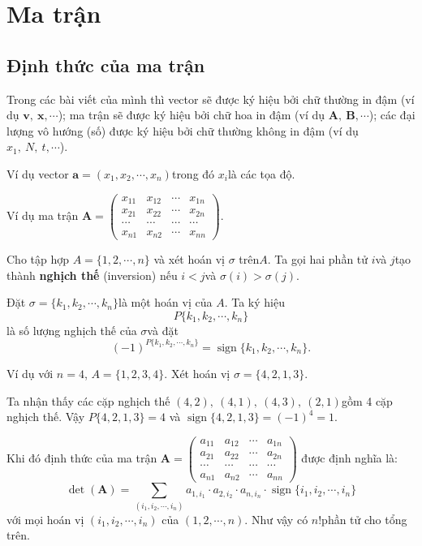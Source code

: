 \documentclass{mynotes}
\DeclareMathOperator{\sign}{sign}
\begin{document}
\tableofcontents

\chapter{Ma trận}

\section{Định thức của ma trận}

Trong các bài viết của mình thì vector sẽ được ký hiệu bởi chữ thường in đậm (ví dụ $\bm{v},\ \bm{x}, \cdots$)​; ma trận sẽ được ký hiệu bởi chữ hoa in đậm (ví dụ $\bm{A},\ \bm{B}, \cdots$​); các đại lượng vô hướng (số) được ký hiệu bởi chữ thường không in đậm (ví dụ $x_1,\ N,\ t, \cdots$).

Ví dụ vector $\bm{a} = (x_1, x_2, \cdots, x_n)$​ trong đó $x_i$​ là các tọa độ.

Ví dụ ma trận $\bm{A} = \begin{pmatrix}x_{11} & x_{12} & \cdots & x_{1n} \\ x_{21} & x_{22} & \cdots & x_{2n} \\ \cdots & \cdots & \cdots & \cdots \\ x_{n1} & x_{n2} & \cdots & x_{nn}\end{pmatrix}$.

\begin{definition}
    Cho tập hợp $A = \{1, 2, \cdots, n\}$ và xét hoán vị $\sigma$ trên ​$A$. Ta gọi hai phần tử $i$​ và $j$​ tạo thành \textbf{nghịch thế} (inversion) nếu $i < j$​ và $\sigma(i) > \sigma(j)$.

    Đặt $\sigma = \{k_1, k_2, \cdots, k_n\}$​ là một hoán vị của $A$​. Ta ký hiệu \[ P\{k_1, k_2, \cdots, k_n\} \] là số lượng nghịch thế của $\sigma$​ và đặt \[ (-1)^{P\{k_1, k_2, \cdots, k_n\}} = \sign \{k_1, k_2, \cdots, k_n\}. \]
\end{definition}

Ví dụ với $n=4$​, $A = \{1, 2, 3, 4\}$​. Xét hoán vị $\sigma = \{4, 2, 1, 3\}$.

Ta nhận thấy các cặp nghịch thế $(4, 2),\ (4, 1),\ (4, 3),\ (2, 1)$​ gồm 4 cặp nghịch thế. Vậy $P\{4, 2, 1, 3\} = 4$ và $\sign \{4, 2, 1, 3\}=(-1)^4=1$​.

\begin{definition}
    Khi đó định thức của ma trận $\bm{A} = \begin{pmatrix}a_{11} & a_{12} & \cdots & a_{1n} \\ a_{21} & a_{22} & \cdots & a_{2n} \\ \cdots & \cdots & \cdots & \cdots \\ a_{n1} & a_{n2} & \cdots & a_{nn}\end{pmatrix}$ được định nghĩa là:
    \begin{equation}
        \det(\bm{A})=\displaystyle{\sum_{(i_1, i_2, \cdots, i_n)} a_{1, i_1} \cdot a_{2, i_2} \cdot a_{n, i_n} \cdot \sign\{i_1, i_2, \cdots, i_n\}}
    \end{equation}
    với mọi hoán vị $(i_1, i_2, \cdots, i_n)$ của $(1, 2, \cdots, n)$. Như vậy có $n!$​ phần tử cho tổng trên.
\end{definition}
\end{document}

